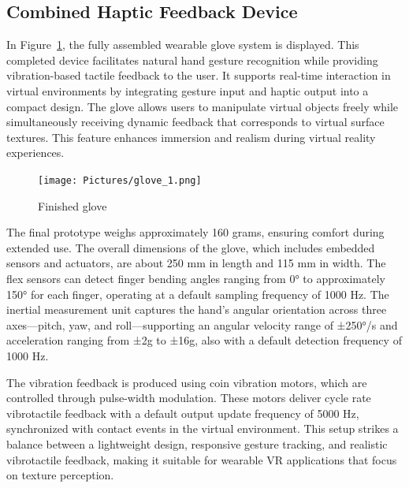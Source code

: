 \subsection{Combined Haptic Feedback Device}
In Figure~\ref{fig:finalglove}, the fully assembled wearable glove system is displayed. This completed device facilitates natural hand gesture recognition while providing vibration-based tactile feedback to the user. It supports real-time interaction in virtual environments by integrating gesture input and haptic output into a compact design. The glove allows users to manipulate virtual objects freely while simultaneously receiving dynamic feedback that corresponds to virtual surface textures. This feature enhances immersion and realism during virtual reality experiences.

\begin{figure}[H]\centering
	\texttt{[image: Pictures/glove\_1.png]}%
	\caption{Finished glove}\label{fig:finalglove}%
\end{figure}

The final prototype weighs approximately 160 grams, ensuring comfort during extended use. The overall dimensions of the glove, which includes embedded sensors and actuators, are about 250 mm in length and 115 mm in width. The flex sensors can detect finger bending angles ranging from 0° to approximately 150° for each finger, operating at a default sampling frequency of 1000 Hz. The inertial measurement unit captures the hand's angular orientation across three axes—pitch, yaw, and roll—supporting an angular velocity range of ±250°/s and acceleration ranging from ±2g to ±16g, also with a default detection frequency of 1000 Hz.

The vibration feedback is produced using coin vibration motors, which are controlled through pulse-width modulation. These motors deliver cycle rate vibrotactile feedback with a default output update frequency of 5000 Hz, synchronized with contact events in the virtual environment. This setup strikes a balance between a lightweight design, responsive gesture tracking, and realistic vibrotactile feedback, making it suitable for wearable VR applications that focus on texture perception.
